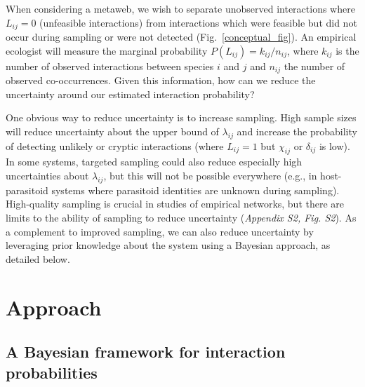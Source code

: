 \documentclass[12pt]{article}
\begin{document}
\begin{spacing}{2.0}
    When considering a metaweb, we wish to separate unobserved interactions where $L_{ij}=0$ (unfeasible interactions) from interactions which were feasible but did not occur during sampling or were not detected (Fig.~\ref{conceptual_fig}). An empirical ecologist will measure the marginal probability $P(L_{ij})=k_{ij}/n_{ij}$, where $k_{ij}$ is the number of observed interactions between species $i$ and $j$ and $n_{ij}$ the number of observed co-occurrences. Given this information, how can we reduce the uncertainty around our estimated interaction probability?


    One obvious way to reduce uncertainty is to increase sampling. High sample sizes will reduce uncertainty about the upper bound of $\lambda_{ij}$ and increase the probability of detecting unlikely or cryptic interactions (where $L_{ij}=1$ but $\chi_{ij}$ or $\delta_{ij}$ is low). In some systems, targeted sampling could also reduce especially high uncertainties about $\lambda_{ij}$, but this will not be possible everywhere (e.g., in host-parasitoid systems where parasitoid identities are unknown during sampling). High-quality sampling is crucial in studies of empirical networks, but there are limits to the ability of sampling to reduce uncertainty (\emph{Appendix S2, Fig. S2}). As a complement to improved sampling, we can also reduce uncertainty by leveraging prior knowledge about the system using a Bayesian approach, as detailed below.


\section*{Approach}

  \subsection*{A Bayesian framework for interaction probabilities}







\end{spacing}
\end{document}
